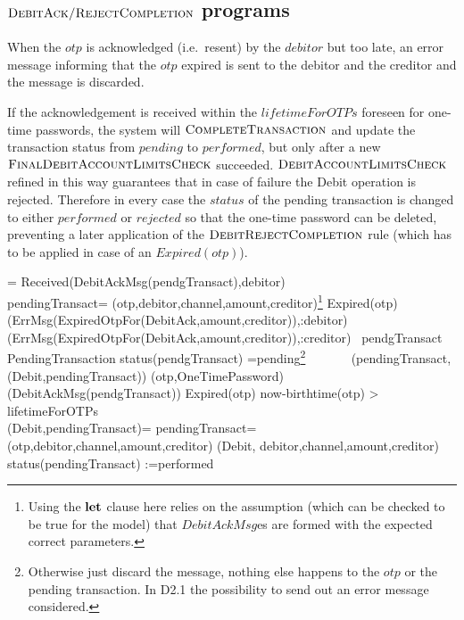 \subsection{ $\hbox{\sc DebitAck/RejectCompletion}$ programs}
\label{sect:debitackreject}

When the $otp$ is acknowledged (i.e.\ resent) by the $debitor$ but too late, an error message informing that the $otp$ expired is sent to the debitor and the creditor and the message is discarded.

 If the acknowledgement is received
within the $lifetimeForOTPs$ foreseen for one-time passwords, the system will $\hbox{\sc CompleteTransaction}$ and update the transaction status from $pending$ to $performed$, but only after a new $\hbox{\sc FinalDebitAccountLimitsCheck}$ succeeded. $\hbox{\sc DebitAccountLimitsCheck}$  refined in this way guarantees that in case of failure the Debit operation is rejected. Therefore in every case the $status$ of the pending transaction is changed to either $performed$ or $rejected$ so that the one-time password can be deleted,  preventing a later application of the $\hbox{\sc DebitRejectCompletion}$ rule (which has to be applied in case of an $Expired(otp)$).


\begin{asm}  
 =\+           
\IF Received(DebitAckMsg(pendgTransact),\FROM debitor) \THEN \\
 \LET pendingTransact= (otp,debitor,channel,amount,creditor)\footnote{Using the $\mathrel{\mathbf{let}}$ clause here relies on the assumption (which can be checked to be true for the model) that $DebitAckMsg$es are formed with the expected correct parameters.}\+
  \IF Expired(otp) \THEN \+
    (ErrMsg(ExpiredOtpFor(DebitAck,amount,creditor)),\TO :debitor) \\
    (ErrMsg(ExpiredOtpFor(DebitAck,amount,creditor)),\TO :creditor)\- 
  \ELSE ~\IF pendgTransact  \in PendingTransaction \AND
    status(pendgTransact) =pending\footnote{Otherwise just discard the message, nothing else happens to the $otp$ or the pending transaction. In D2.1 the possibility to send out an error message considered.}  \+
       \THEN \+
          \+
              ~~~~~~ (pendingTransact,(Debit,pendingTransact))\-
                (otp,OneTimePassword)\dec\dec\-  
(DebitAckMsg(pendgTransact)) \dec\-
\WHERE \+
Expired(otp) \IFF now-birthtime(otp) > lifetimeForOTPs\\
(Debit,pendingTransact)=\+
  \LET pendingTransact=(otp,debitor,channel,amount,creditor)\+
  (Debit, debitor,channel,amount,creditor)\\
  status(pendingTransact) :=performed
\end{asm}

